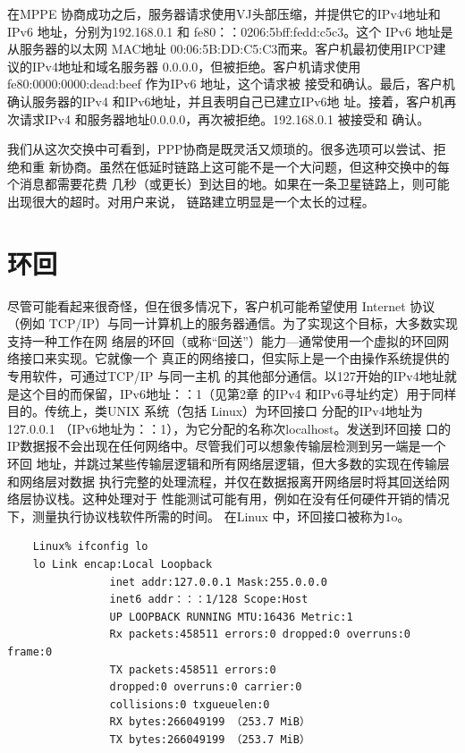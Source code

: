 在MPPE 协商成功之后，服务器请求使用VJ头部压缩，并提供它的IPv4地址和IPv6
地址，分别为192.168.0.1 和 fe80：：0206:5bff:fedd:c5c3。这个 IPv6 地址是从服务器的以太网
MAC地址 00:06:5B:DD:C5:C3而来。客户机最初使用IPCP建议的IPv4地址和域名服务器
0.0.0.0，但被拒绝。客户机请求使用 fe80:0000:0000:dead:beef 作为IPv6 地址，这个请求被
接受和确认。最后，客户机确认服务器的IPv4 和IPv6地址，并且表明自己已建立IPv6地
址。接着，客户机再次请求IPv4 和服务器地址0.0.0.0，再次被拒绝。192.168.0.1 被接受和
确认。

我们从这次交换中可看到，PPP协商是既灵活又烦琐的。很多选项可以尝试、拒绝和重
新协商。虽然在低延时链路上这可能不是一个大问题，但这种交换中的每个消息都需要花费
几秒（或更长）到达目的地。如果在一条卫星链路上，则可能出现很大的超时。对用户来说，
链路建立明显是一个太长的过程。

\section{环回}

尽管可能看起来很奇怪，但在很多情况下，客户机可能希望使用 Internet 协议（例如
TCP/IP）与同一计算机上的服务器通信。为了实现这个目标，大多数实现支持一种工作在网
络层的环回（或称“回送”）能力—通常使用一个虚拟的环回网络接口来实现。它就像一个
真正的网络接口，但实际上是一个由操作系统提供的专用软件，可通过TCP/IP 与同一主机
的其他部分通信。以127开始的IPv4地址就是这个目的而保留，IPv6地址：：1（见第2章
的IPv4 和IPv6寻址约定）用于同样目的。传统上，类UNIX 系统（包括 Linux）为环回接口
分配的IPv4地址为127.0.0.1 （IPv6地址为：：1），为它分配的名称次localhost。发送到环回接
口的IP数据报不会出现在任何网络中。尽管我们可以想象传输层检测到另一端是一个环回
地址，并跳过某些传输层逻辑和所有网络层逻辑，但大多数的实现在传输层和网络层对数据
执行完整的处理流程，并仅在数据报离开网络层时将其回送给网络层协议栈。这种处理对于
性能测试可能有用，例如在没有任何硬件开销的情况下，测量执行协议栈软件所需的时间。
在Linux 中，环回接口被称为1o。

\begin{verbatim}
    Linux% ifconfig lo
    lo Link encap:Local Loopback
                inet addr:127.0.0.1 Mask:255.0.0.0
                inet6 addr：：：1/128 Scope:Host
                UP LOOPBACK RUNNING MTU:16436 Metric:1
                Rx packets:458511 errors:0 dropped:0 overruns:0 frame:0
                TX packets:458511 errors:0
                dropped:0 overruns:0 carrier:0
                collisions:0 txgueuelen:0
                RX bytes:266049199 （253.7 MiB）
                TX bytes:266049199 （253.7 MiB）
\end{verbatim}

